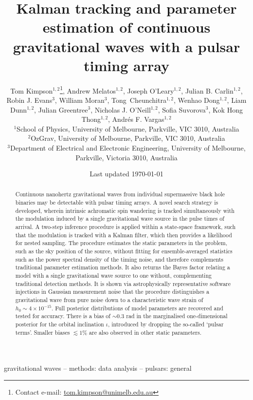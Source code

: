 \documentclass[fleqn,usenatbib,useAMS]{mnras}
\title[Kalman PTA]{Kalman tracking and parameter estimation of continuous gravitational waves with a pulsar timing array}
\author[Kimpson]{Tom Kimpson$^{1,2}$\thanks{Contact e-mail: \href{tom.kimpson@unimelb.edu.au}{tom.kimpson@unimelb.edu.au}}, Andrew Melatos$^{1,2}$, Joseph O'Leary$^{1,2}$, Julian B. Carlin$^{1,2}$, Robin J. Evans$^{3}$, \newauthor William Moran$^{3}$, Tong Cheunchitra$^{1,2}$, Wenhao Dong$^{1,2}$, Liam Dunn$^{1,2}$, Julian Greentree$^{3}$, Nicholas J. O'Neill$^{1,2}$, \newauthor Sofia Suvorova$^{3}$, Kok Hong Thong$^{1,2}$, Andrés F. Vargas$^{1,2}$%
\\
$^{1}$School of Physics, University of Melbourne, Parkville, VIC 3010, Australia \\
$^{2}$OzGrav, University of Melbourne, Parkville, VIC 3010, Australia \\
$^{3}$Department of Electrical and Electronic Engineering, University of Melbourne, Parkville, Victoria 3010, Australia }
\date{Last updated \today}
\begin{document}
\label{firstpage}
\pagerange{\pageref{firstpage}--\pageref{lastpage}}
\maketitle

\begin{abstract}	
Continuous nanohertz gravitational waves from individual supermassive black hole binaries may be detectable with pulsar timing arrays. A novel search strategy is developed, wherein intrinsic achromatic spin wandering is tracked simultaneously with the modulation induced by a single gravitational wave source in the pulse times of arrival. A two-step inference procedure is applied within a state-space framework, such that the modulation is tracked with a Kalman filter, which then provides a likelihood for nested sampling. The procedure estimates the static parameters in the problem, such as the sky position of the source, without fitting for ensemble-averaged statistics such as the power spectral density of the timing noise, and therefore complements traditional parameter estimation methods. It also returns the Bayes factor relating a model with a single gravitational wave source to one without, complementing traditional detection methods. It is shown via astrophysically representative software injections in Gaussian measurement noise that the procedure distinguishes a gravitational wave from pure noise down to a characteristic wave strain of $h_0 \sim 4 \times 10^{-15}$. Full posterior distributions of model parameters are recovered and tested for accuracy. There is a bias of $\sim 0.3$ rad in the marginalised one-dimensional posterior for the orbital inclination $\iota$, introduced by dropping the so-called `pulsar terms'. Smaller biases $\lesssim 1 \%$ are also observed in other static parameters.
\end{abstract}

\begin{keywords}
gravitational waves -- methods: data analysis -- pulsars: general
\end{keywords}



\begingroup
\let\clearpage\relax
\endgroup
\newpage
\end{document}
